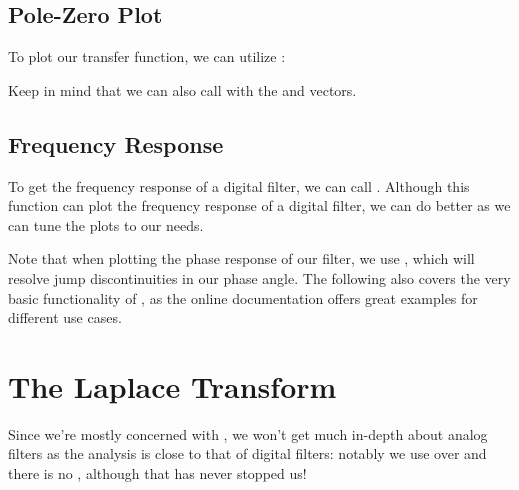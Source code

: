 \documentclass{article}
\begin{document}

\newpage

\subsection{Pole-Zero Plot}

To plot our transfer function, we can utilize :


Keep in mind that we can also call  with the  and
 vectors.

\subsection{Frequency Response}

To get the frequency response of a digital filter, we can call
.  Although this function can plot the frequency response of a
digital filter, we can do better as we can tune the plots to our needs.

Note that when plotting the phase response of our filter, we use
, which will resolve jump discontinuities in our phase angle.
The following also covers the very basic functionality of , as the
online documentation offers great examples for different use cases.


\section{The Laplace Transform}

Since we're mostly concerned with , we won't get much in-depth about analog filters as the analysis
is close to that of digital filters: notably we use  over  and there
is no , although that has never stopped us!

\inputminted{matlab}{06-filter-analysis.d/splane.m}
\end{document}
